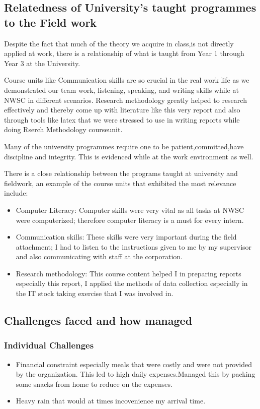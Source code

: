 \documentclass{article}
\begin{document}
\subsection{Relatedness of University’s taught programmes to the Field work}
Despite the fact that much of the theory we acquire in class,is not directly applied at work, there is a  relationship  of what is taught from Year 1 through Year 3 at the University.
\par Course units like Communication skills are so crucial in the real work life as we demonstrated
our team work, listening, speaking, and writing skills while at NWSC in different scenarios.  Research methodology greatly helped to research effectively and thereby come up with literature like this very report and also through tools like latex that we were stressed to use in writing reports while doing Rserch Methodology courseunit.
\par Many of the university programmes require one to be  patient,committed,have discipline
and integrity. This is evidenced while at the work environment as well.
\par There is a close relationship between the programs taught at university and fieldwork, an example of the course units that exhibited the most relevance include:
\begin{itemize}
\item Computer Literacy: Computer skills were very vital as all tasks at NWSC were computerized; therefore computer literacy is a must for every intern.
\item Communication skills: These skills were very important during the field attachment; I had to listen to the instructions given to me by my supervisor and also communicating with staff at the corporation.
\item Research methodology: This course content helped I in preparing reports especially this report, I applied the
methods of data collection especially in the IT stock taking exercise that I was involved in.
\end{itemize}
\subsection{Challenges faced and how managed}
\subsubsection{Individual Challenges}
\begin{itemize}
\item Financial constraint especially meals that were costly and were not provided by the organization. This led to high daily expenses.Managed this by packing some snacks from home to reduce on the expenses.
\item Heavy rain that would at times incovenience my arrival time.
\end{itemize}
\end{document}
